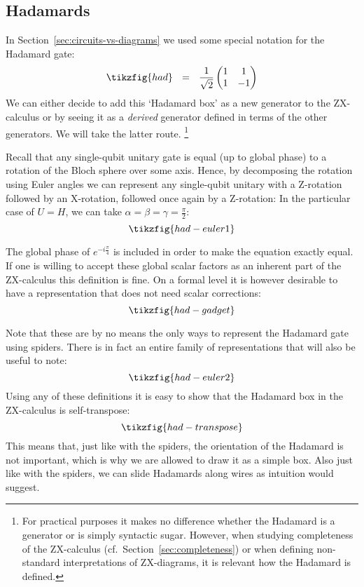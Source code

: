 \documentclass[a4paper,onecolumn,superscriptaddress,11pt,%
				unpublished,%
				allowfontchageintitle,%
				]{quantumarticle}
\begin{document}
\subsection{Hadamards}
In Section~\ref{sec:circuits-vs-diagrams} we used some special notation for the Hadamard gate:
\begin{equation*}
	\tikzfig{had}\ \ =\ \ \frac{1}{\sqrt{2}}\begin{pmatrix}1&1\\1&-1\end{pmatrix}
\end{equation*}
We can either decide to add this `Hadamard box' as a new generator to the ZX-calculus or by seeing it as a \emph{derived} generator defined in terms of the other generators. We will take the latter route.%
\footnote{For practical purposes it makes no difference whether the Hadamard is a generator or is simply syntactic sugar. However, when studying completeness of the ZX-calculus (cf.~Section~\ref{sec:completeness}) or when defining non-standard interpretations of ZX-diagrams, it is relevant how the Hadamard is defined.}

Recall that any single-qubit unitary gate is equal (up to global phase) to a rotation of the Bloch sphere over some axis. Hence, by decomposing the rotation using Euler angles we can represent any single-qubit unitary with a Z-rotation followed by an X-rotation, followed once again by a Z-rotation:
In the particular case of $U=H$, we can take $\alpha=\beta=\gamma=\frac\pi2$:
\begin{equation}\label{eq:had-euler1}
\tikzfig{had-euler1}
\end{equation}

The global phase of $e^{-i\frac\pi4}$ is included in order to make the equation exactly equal. If one is willing to accept these global scalar factors as an inherent part of the ZX-calculus this definition is fine. On a formal level it is however desirable to have a representation that does not need scalar corrections:
\begin{equation}\label{eq:had-gadget}
\tikzfig{had-gadget}
\end{equation}

Note that these are by no means the only ways to represent the Hadamard gate using spiders. There is in fact an entire family of representations that will also be useful to note:
\begin{equation*}
	\tikzfig{had-euler2}
\end{equation*}
Using any of these definitions it is easy to show that the Hadamard box in the ZX-calculus is self-transpose:
\begin{equation}
\tikzfig{had-transpose}
\end{equation}
This means that, just like with the spiders, the orientation of the Hadamard is not important, which is why we are allowed to draw it as a simple box. Also just like with the spiders, we can slide Hadamards along wires as intuition would suggest.
\end{document}
